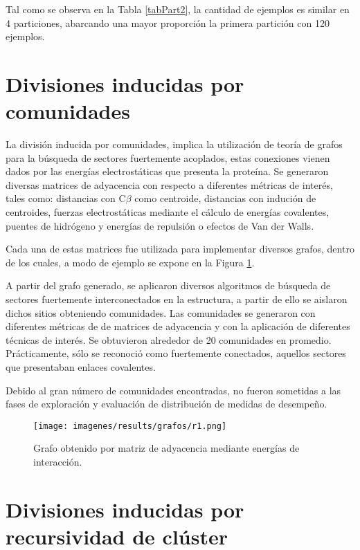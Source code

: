 Tal como se observa en la Tabla \ref{tabPart2}, la cantidad de ejemplos es similar en 4 particiones, abarcando una mayor proporci\'on la primera partici\'on con 120 ejemplos.


\section{Divisiones inducidas por comunidades}

La divisi\'on inducida por comunidades, implica la utilizaci\'on de teor\'ia de grafos para la b\'usqueda de sectores fuertemente acoplados, estas conexiones vienen dados por las energ\'ias electrost\'aticas que presenta la prote\'ina. Se generaron diversas matrices de adyacencia con respecto a diferentes m\'etricas de inter\'es, tales como: distancias con C$\beta$ como centroide, distancias con induci\'on de centroides, fuerzas electrost\'aticas mediante el c\'alculo de energ\'ias covalentes, puentes de hidr\'ogeno y energ\'ias de repulsi\'on o efectos de Van der Walls.

Cada una de estas matrices fue utilizada para implementar diversos grafos, dentro de los cuales, a modo de ejemplo se expone en la Figura \ref{com1}. 

A partir del grafo generado, se aplicaron diversos algoritmos de b\'usqueda de sectores fuertemente interconectados en la estructura, a partir de ello se aislaron dichos sitios obteniendo comunidades. Las comunidades se generaron con diferentes m\'etricas de de matrices de adyacencia y con la aplicaci\'on de diferentes t\'ecnicas de inter\'es. Se obtuvieron alrededor de 20 comunidades en promedio. Pr\'acticamente, s\'olo se reconoci\'o como fuertemente conectados, aquellos sectores que presentaban enlaces covalentes. 

Debido al gran n\'umero de comunidades encontradas, no fueron sometidas a las fases de exploraci\'on y evaluaci\'on de distribuci\'on de medidas de desempe\~no.

\begin{figure}[!h]
	\centering
	\texttt{[image: imagenes/results/grafos/r1.png]}
	\caption{Grafo obtenido por matriz de adyacencia mediante energ\'ias de interacci\'on.}
	\label{com1}
\end{figure}

\newpage
\section{Divisiones inducidas por recursividad de cl\'uster}

